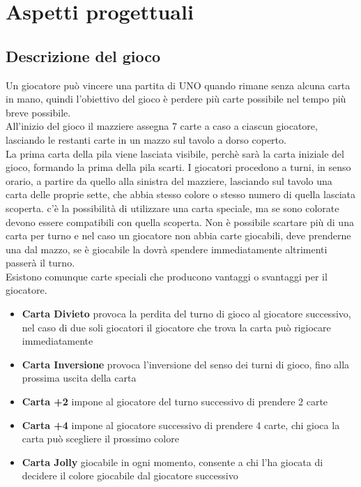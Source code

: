 \documentclass[10pt,a4paper]{article}
\begin{document}
\section{Aspetti progettuali}
\subsection{Descrizione del gioco}
Un giocatore può vincere una partita di UNO quando rimane senza alcuna carta in mano, quindi l'obiettivo del gioco è perdere più carte possibile nel tempo più breve possibile.\\All'inizio del gioco il mazziere assegna 7 carte a caso a ciascun giocatore, lasciando le restanti carte in un mazzo sul tavolo a dorso coperto.\\ La prima carta della pila viene lasciata visibile, perchè sarà la carta iniziale del gioco, formando la prima della pila scarti. I giocatori procedono a turni, in senso orario, a partire da quello alla sinistra del mazziere, lasciando sul tavolo una carta delle proprie sette, che abbia stesso colore o stesso numero di quella lasciata scoperta. c'è la possibilità di utilizzare una carta speciale, ma se sono colorate devono essere compatibili con quella scoperta. Non è possibile scartare più di una carta per turno e nel caso un giocatore non abbia carte giocabili, deve prenderne una dal mazzo, se è giocabile la dovrà spendere immediatamente altrimenti passerà il turno.\\ Esistono comunque carte speciali che producono vantaggi o svantaggi per il giocatore.\\

\begin{itemize}
\item \textbf{Carta Divieto} provoca la perdita del turno di gioco al giocatore successivo, nel caso di due soli giocatori il giocatore che trova la carta può rigiocare immediatamente
\item \textbf{Carta Inversione} provoca l'inversione del senso dei turni di gioco, fino alla prossima uscita della carta
\item \textbf{Carta +2} impone al giocatore del turno successivo di prendere 2 carte
\item \textbf{Carta +4} impone al giocatore successivo di prendere 4 carte, chi gioca la carta può scegliere il prossimo colore
\item \textbf{Carta Jolly} giocabile in ogni momento, consente a chi l'ha giocata di decidere il colore giocabile dal giocatore successivo
\end{itemize}
\end{document}
